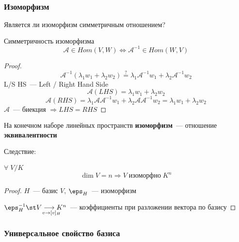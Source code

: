 \vspace{1\baselineskip}

\subsubsection{Изоморфизм}

Является ли изоморфизм симметричным отношением?

\begin{Proposition}{Симметричность изоморфизма}{}
    \[
    \mathcal{A} \in Hom(V, W) \Longleftrightarrow \mathcal{A}^{-1} \in Hom(W, V)
    \]
\end{Proposition}

\begin{proof}
    \[
    \mathcal{A}^{-1}(\lambda_1w_1+\lambda_2w_2) \overset{?}{=} \lambda_1 \mathcal{A}^{-1} w_1 + \lambda_2 \mathcal{A}^{-1} w_2 
    \]
    L/S HS~--- Left / Right Hand Side 
    \[
    \mathcal{A}(LHS) = \lambda_1w_1 + \lambda_2w_2
    \]
    \[
    \mathcal{A}(RHS) = \lambda_1 \mathcal{A} \mathcal{A}^{-1}w_1 + \lambda_2 \mathcal{A} \mathcal{A}^{-1} w_2 = \lambda_1 w_1 + \lambda_2 w_2
    \]
    $\mathcal{A}$~--- биекция $\Rightarrow LHS = RHS$
\end{proof}

\vspace{1\baselineskip}

\begin{remark}
На конечном наборе линейных пространств \textbf{изоморфизм}~--- отношение \textbf{эквивалентности}
\end{remark}

\vspace{1\baselineskip}

Следствие: 

$\forall \; V / K$
\[ \dim V = n \Rightarrow V \; \text{изоморфно} \; K^n \]
\begin{proof}

    $H$~--- базис $V$, \; $\eps_H$~--- изоморфизм

    $\eps^{-1}_H \st \underset{v \rightarrow [v]_H}{V \longrightarrow K^n}$~--- коэффициенты при разложении вектора по базису
\end{proof}

\vspace{1\baselineskip}

\subsubsection{Универсальное свойство базиса}

